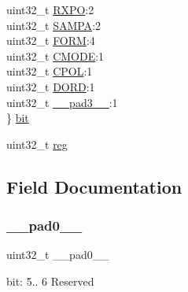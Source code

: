 \begin{DoxyCompactItemize}
\begin{tabbing}
\>uint32\_t \mbox{\hyperlink{union_s_e_r_c_o_m___u_s_a_r_t___c_t_r_l_a___type_a0b904ffe18a66a2794480854a37a5303}{RXPO}}:2\\
\>uint32\_t \mbox{\hyperlink{union_s_e_r_c_o_m___u_s_a_r_t___c_t_r_l_a___type_af3a67d9e478daabb82313c1159fca368}{SAMPA}}:2\\
\>uint32\_t \mbox{\hyperlink{union_s_e_r_c_o_m___u_s_a_r_t___c_t_r_l_a___type_ae3792567859cd4a01a4d503b1bb3b9c9}{FORM}}:4\\
\>uint32\_t \mbox{\hyperlink{union_s_e_r_c_o_m___u_s_a_r_t___c_t_r_l_a___type_ab19445459f272e1b3a4b15c2425d5170}{CMODE}}:1\\
\>uint32\_t \mbox{\hyperlink{union_s_e_r_c_o_m___u_s_a_r_t___c_t_r_l_a___type_a816478ce3c6267bc9f66be53517dec36}{CPOL}}:1\\
\>uint32\_t \mbox{\hyperlink{union_s_e_r_c_o_m___u_s_a_r_t___c_t_r_l_a___type_abc1e8d61860eb51bb34876e85258b136}{DORD}}:1\\
\>uint32\_t \mbox{\hyperlink{union_s_e_r_c_o_m___u_s_a_r_t___c_t_r_l_a___type_a4854608c0e776f0704a4d9a4b98ea57d}{\_\_pad3\_\_}}:1\\
\} \mbox{\hyperlink{union_s_e_r_c_o_m___u_s_a_r_t___c_t_r_l_a___type_a35edac1952f8781fe66c45549dc202f9}{bit}}\\

\end{tabbing}\item 
uint32\+\_\+t \mbox{\hyperlink{union_s_e_r_c_o_m___u_s_a_r_t___c_t_r_l_a___type_a6b91636401516a477989a336376d7b40}{reg}}
\end{DoxyCompactItemize}


\subsection{Field Documentation}
\mbox{\label{union_s_e_r_c_o_m___u_s_a_r_t___c_t_r_l_a___type_a3e57c2ef1c3ffb36722f000cc1156824}} 
\subsubsection{\texorpdfstring{\_\_pad0\_\_}{\_\_pad0\_\_}}
{\footnotesize\ttfamily uint32\+\_\+t \+\_\+\+\_\+pad0\+\_\+\+\_\+}

bit\+: 5.. 6 Reserved \mbox{\label{union_s_e_r_c_o_m___u_s_a_r_t___c_t_r_l_a___type_a6712ba6dd1d5b43d2d56ff8ac4e275a7}} 
